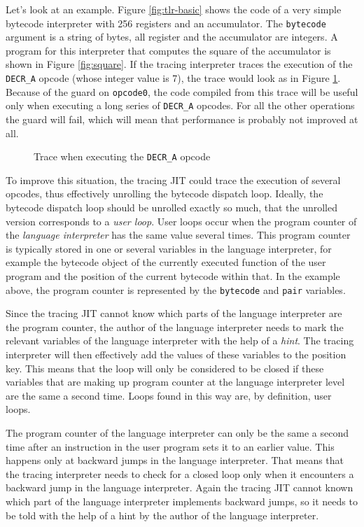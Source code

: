 \documentclass{acm_proc_article-sp}
\newcommand\fijal[1]{\nb{FIJAL}{#1}}
\begin{document}
\fijal{This paragraph should go away as well}
Let's look at an example. Figure \ref{fig:tlr-basic} shows the code of a very
simple bytecode interpreter with 256 registers and an accumulator. The
\texttt{bytecode} argument is a string of bytes, all register and the
accumulator are integers. A program for this interpreter that computes
the square of the accumulator is shown in Figure \ref{fig:square}. If the
tracing interpreter traces the execution of the \texttt{DECR\_A} opcode (whose
integer value is 7), the trace would look as in Figure \ref{fig:trace-normal}.
Because of the guard on \texttt{opcode0}, the code compiled from this trace will
be useful only when executing a long series of \texttt{DECR\_A} opcodes. For all
the other operations the guard will fail, which will mean that performance is
probably not improved at all.

\begin{figure}

\vspace{-0.4cm}
\caption{Trace when executing the \texttt{DECR\_A} opcode}
\label{fig:trace-normal}
\end{figure}

To improve this situation, the tracing JIT could trace the execution of several
opcodes, thus effectively unrolling the bytecode dispatch loop. Ideally, the
bytecode dispatch loop should be unrolled exactly so much, that the unrolled version
corresponds to a \emph{user loop}. User loops
occur when the program counter of the \emph{language interpreter} has the
same value several times. This program counter is typically stored in one or several
variables in the language interpreter, for example the bytecode object of the
currently executed function of the user program and the position of the current
bytecode within that.  In the example above, the program counter is represented by 
the \texttt{bytecode} and \texttt{pair} variables.

Since the tracing JIT cannot know which parts of the language interpreter are
the program counter, the author of the language interpreter needs to mark the
relevant variables of the language interpreter with the help of a \emph{hint}.
The tracing interpreter will then effectively add the values of these variables
to the position key. This means that the loop will only be considered to be
closed if these variables that are making up program counter at the language
interpreter level are the same a second time.  Loops found in this way are, by
definition, user loops.

The program counter of the language interpreter can only be the same a
second time after an instruction in the user program sets it to an earlier
value. This happens only at backward jumps in the language interpreter. That
means that the tracing interpreter needs to check for a closed loop only when it
encounters a backward jump in the language interpreter. Again the tracing JIT
cannot known which part of the language interpreter implements backward jumps,
so it needs to be told with the help of a hint by the author of the language
interpreter.
\end{document}
